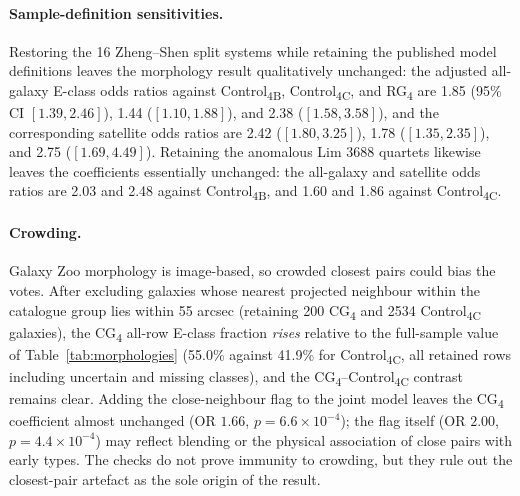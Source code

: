 \documentclass{aa}
\newcommand{\CB}{Control\textsubscript{4B}}
\newcommand{\CC}{Control\textsubscript{4C}}
\newcommand{\CG}{CG\textsubscript{4}}
\newcommand{\RG}{RG\textsubscript{4}}
\begin{document}
\begin{appendix}
\paragraph{Sample-definition sensitivities.} Restoring the 16 Zheng--Shen split systems while retaining the published model definitions leaves the morphology result qualitatively unchanged: the adjusted all-galaxy E-class odds ratios against \CB{}, \CC{}, and \RG{} are 1.85 (95\% CI \([1.39, 2.46]\)), 1.44 (\([1.10, 1.88]\)), and 2.38 (\([1.58, 3.58]\)), and the corresponding satellite odds ratios are 2.42 (\([1.80, 3.25]\)), 1.78 (\([1.35, 2.35]\)), and 2.75 (\([1.69, 4.49]\)). Retaining the anomalous Lim 3688 quartets likewise leaves the coefficients essentially unchanged: the all-galaxy and satellite odds ratios are 2.03 and 2.48 against \CB{}, and 1.60 and 1.86 against \CC{}.









\paragraph{Crowding.} Galaxy Zoo morphology is image-based, so crowded closest pairs could bias the votes. After excluding galaxies whose nearest projected neighbour within the catalogue group lies within 55 arcsec (retaining 200 \CG{} and 2534 \CC{} galaxies), the \CG{} all-row E-class fraction \emph{rises} relative to the full-sample value of Table~\ref{tab:morphologies} (55.0\% against 41.9\% for \CC{}, all retained rows including uncertain and missing classes), and the \CG{}--\CC{} contrast remains clear. Adding the close-neighbour flag to the joint model leaves the \CG{} coefficient almost unchanged (OR \(1.66\), \(p = 6.6\times 10^{-4}\)); the flag itself (OR \(2.00\), \(p = 4.4\times 10^{-4}\)) may reflect blending or the physical association of close pairs with early types. The checks do not prove immunity to crowding, but they rule out the closest-pair artefact as the sole origin of the result.






\end{appendix}
\end{document}
